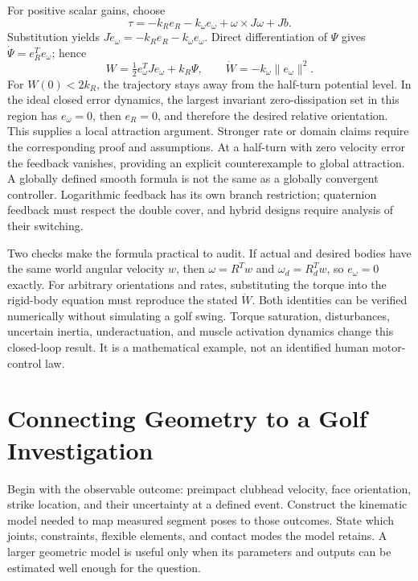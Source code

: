 For positive scalar gains, choose
\begin{equation}\label{eq:pd_so3}
 \tau=-k_R e_R-k_\omega e_\omega+\omega\times J\omega+Jb.
\end{equation}
Substitution yields $J\dot e_\omega=-k_R e_R-k_\omega e_\omega$.
Direct differentiation of $\Psi$ gives $\dot\Psi=e_R^Te_\omega$; hence
\begin{equation}\label{eq:manifold_attitude_energy}
 W=\tfrac12e_\omega^TJe_\omega+k_R\Psi,\qquad
 \dot W=-k_\omega\|e_\omega\|^2.
\end{equation}
For $W(0)<2k_R$, the trajectory stays away from the half-turn potential level.
In the ideal closed error dynamics, the largest invariant zero-dissipation
set in this region has $e_\omega=0$, then $e_R=0$, and therefore the desired
relative orientation. This supplies a local attraction argument. Stronger
rate or domain claims require the corresponding proof and assumptions.
At a half-turn with zero velocity error the feedback vanishes, providing an
explicit counterexample to global attraction. A globally defined smooth
formula is not the same as a globally convergent controller. Logarithmic
feedback has its own branch restriction; quaternion feedback must respect
the double cover, and hybrid designs require analysis of their switching.

Two checks make the formula practical to audit. If actual and desired bodies
have the same world angular velocity $w$, then $\omega=R^Tw$ and
$\omega_d=R_d^Tw$, so $e_\omega=0$ exactly. For arbitrary orientations and
rates, substituting the torque into the rigid-body equation must reproduce
the stated $\dot W$. Both identities can be verified numerically without
simulating a golf swing. Torque saturation, disturbances, uncertain inertia,
underactuation, and muscle activation dynamics change this closed-loop result.
It is a mathematical example, not an identified human motor-control law.

\section{Connecting Geometry to a Golf Investigation}

Begin with the observable outcome: preimpact clubhead velocity, face orientation,
strike location, and their uncertainty at a defined event. Construct the
kinematic model needed to map measured segment poses to those outcomes.
State which joints, constraints, flexible elements, and contact modes the
model retains. A larger geometric model is useful only when its parameters
and outputs can be estimated well enough for the question.

